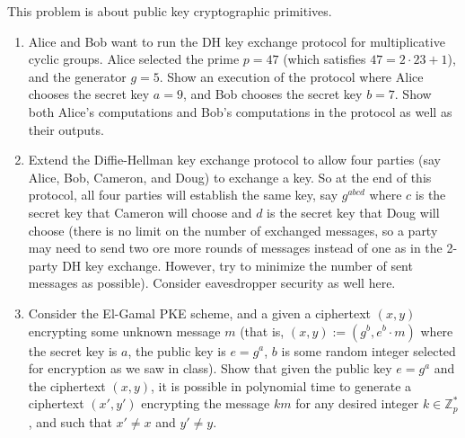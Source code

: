 \documentclass[12pt]{article}
\begin{document}
This problem is about public key cryptographic primitives.
\begin{enumerate}

\item Alice and Bob want to run the DH key exchange protocol for multiplicative cyclic groups. Alice selected the prime $p=47$ (which satisfies $47=2\cdot 23+1$), and the generator $g=5$. Show an execution of the protocol where Alice chooses the secret key $a=9$, and Bob chooses the secret key $b=7$. Show both Alice's computations and Bob's computations in the protocol as well as their outputs.

\item Extend the Diffie-Hellman key exchange protocol to allow four parties (say Alice, Bob, Cameron, and Doug) to exchange a key. So at the end of this protocol, all four parties will establish the same key, say $g^{abcd}$ where $c$ is the secret key that Cameron will choose and $d$ is the secret key that Doug will choose (there is no limit on the number of exchanged messages, so a party may need to send two ore more rounds of messages instead of one as in the 2-party DH key exchange. However, try to minimize the number of sent messages as possible). Consider eavesdropper security as well here.

\item Consider the El-Gamal PKE scheme, and a given a ciphertext $(x,y)$  encrypting some unknown message $m$ (that is, $(x,y) := (g^b, e^b\cdot m)$ where the secret key is $a$, the public key is $e = g^a$, $b$ is some random integer selected for encryption as we saw in class).
Show that given the public key $e = g^a$ and the ciphertext $(x,y)$, it is possible in polynomial time to generate a ciphertext $(x',y')$ encrypting the message $km$ for any desired integer $k \in \mathbb{Z}^*_p$, and such that $x' \neq x$ and $y'\neq y$.
\end{enumerate}
\end{document}
